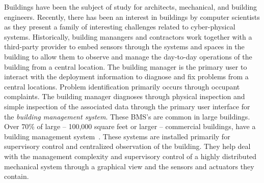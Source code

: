 Buildings have been the subject of study for architects, mechanical, and building engineers.  Recently, there has been an 
interest in buildings by computer scientists as they present a family of interesting challenges related to cyber-physical systems.
Historically, building manangers and contractors work together with a third-party provider to embed sensors through the systems
and spaces in the building to allow them to observe and manage
the day-to-day operations of the building from a central location.  The building manager is the primary user to interact with the
deployment information to diagnose and fix problems from a central locations.  Problem identification primarily occurs through occupant 
complaints.  The building manager diagnoses through physical inspection and simple inspection of the associated data through the primary
user interface for the \emph{building management system}.  These BMS's are common in large buildings.
Over 70\% of large -- 100,000 square feet or larger -- commercial buildings, have a building management 
system~\cite{cbecs2003}.  These systems are installed primarily for supervisory control and
centralized observation of the building.  
They help deal with the management complexity and supervisory control of a highly distributed mechanical system through
a graphical view and the sensors and actuators they contain.








